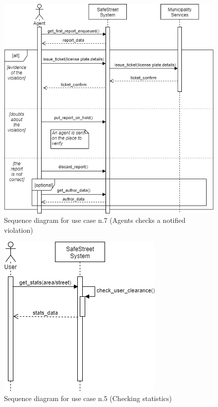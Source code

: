 \documentclass[a4paper]{report}
\begin{document}
\begin{figure}[H]
\includegraphics[width=\textwidth]{SequenceAgentCheckReport}
\caption{Sequence diagram for use case n.7 (Agents checks a notified violation) }
\label{fig:seq-agentcheckreport}
\end{figure}

\begin{figure}[H]
\centering
\includegraphics[scale=0.7]{SequenceCheckStatistics}
\caption{Sequence diagram for use case n.5 (Checking statistics) }
\label{fig:seq-checkstats}
\end{figure}
\end{document}
